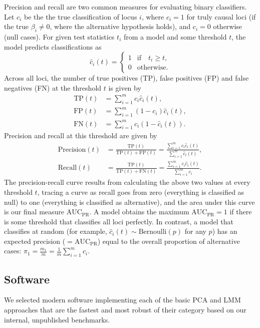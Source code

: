 \documentclass[11pt]{article}
\newcommand{\auc}{\text{AUC}_\text{PR}}
\begin{document}
Precision and recall are two common measures for evaluating binary classifiers.
Let $c_i$ be the the true classification of locus $i$, where $c_i = 1$ for truly causal loci (if the true $\beta_i \ne 0$, where the alternative hypothesis holds), and $c_i = 0$ otherwise (null cases).
For given test statistics $t_i$ from a model and some threshold $t$, the model predicts classifications as
$$
\hat{c}_i(t) =
\begin{cases}
  1 & \text{if} \quad t_i \ge t, \\
  0 & \text{otherwise}.
\end{cases}
$$
Across all loci, the number of true positives (TP), false positives (FP) and false negatives (FN) at the threshold $t$ is given by
\begin{align*}
  \text{TP}(t)
  &=
    \sum_{i = 1}^m c_i \hat{c}_i(t)
    , \\
  \text{FP}(t)
  &=
    \sum_{i = 1}^m (1 - c_i) \hat{c}_i(t)
    , \\
  \text{FN}(t)
  &=
    \sum_{i = 1}^m c_i \left( 1 - \hat{c}_i(t) \right)
    .
\end{align*}
Precision and recall at this threshold are given by
\begin{align*}
  \text{Precision}(t)
  &=
    \frac{ \text{TP}(t) }{ \text{TP}(t) + \text{FP}(t) }
    =
    \frac{ \sum_{i = 1}^m c_i \hat{c}_i(t) }{ \sum_{i = 1}^m \hat{c}_i(t) }
    , \\
  \text{Recall}(t)
  &=
    \frac{ \text{TP}(t) }{ \text{TP}(t) + \text{FN}(t) }
    =
    \frac{ \sum_{i = 1}^m c_i \hat{c}_i(t) }{ \sum_{i = 1}^m c_i }
    .
\end{align*}
The precision-recall curve results from calculating the above two values at every threshold $t$, tracing a curve as recall goes from zero (everything is classified as null) to one (everything is classified as alternative), and the area under this curve is our final measure $\auc$.
A model obtains the maximum $\auc = 1$ if there is some threshold that classifies all loci perfectly.
In contrast, a model that classifies at random (for example, $\hat{c}_i(t) \sim \text{Bernoulli}(p)$ for any $p$) has an expected precision ($= \auc$) equal to the overall proportion of alternative cases:
$\pi_1 = \frac{m_1}{m} = \frac{1}{m} \sum_{i = 1}^m c_i$.

\subsection{Software}

We selected modern software implementing each of the basic PCA and LMM approaches that are the fastest and most robust of their category based on our internal, unpublished benchmarks.
\end{document}
